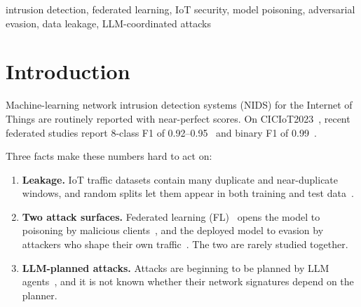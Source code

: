\documentclass[conference]{IEEEtran}
\begin{document}
\begin{abstract}
On GridStratLLM, LLM-planned attacks are detected across planning LLMs (leave-one-LLM-out AUC 0.90--1.00), even without the ARP signature.
A Flower deployment across two Azure virtual machines and a laptop reproduces the simulator to four decimals.
On real traffic without attacks from a laptop on home Wi-Fi, however, the same 1\,\% rule flags 86--89\,\% of windows, mostly HTTP/3 (QUIC). Adding 2.6 minutes of that laptop's benign traffic to training lowers this to 0.45\,\% on held-out traffic from the same session without reducing CICIoT2023 detection.
A YouTube streaming capture recorded three days later supports both results. The locally trained model raises 1.4\,\% false alarms on it. Slowing down, padding or re-TTLing its packets never changes the invariant model's verdict (0 of 20,190 windows), while it changes 3--23\,\% of the plain MLP's verdicts.
\end{abstract}

\begin{IEEEkeywords}
intrusion detection, federated learning, IoT security, model poisoning, adversarial evasion, data leakage, LLM-coordinated attacks
\end{IEEEkeywords}

\section{Introduction}
Machine-learning network intrusion detection systems (NIDS) for the Internet of Things are routinely reported with near-perfect scores. On CICIoT2023~\cite{neto2023ciciot}, recent federated studies report 8-class F1 of 0.92--0.95~\cite{bilal2026dataset} and binary F1 of 0.99~\cite{nayak2026byzantine}.

Three facts make these numbers hard to act on:
\begin{enumerate}
\item \textbf{Leakage.} IoT traffic datasets contain many duplicate and near-duplicate windows, and random splits let them appear in both training and test data~\cite{arp2022dos}.
\item \textbf{Two attack surfaces.} Federated learning (FL)~\cite{mcmahan2017fedavg} opens the model to poisoning by malicious clients~\cite{bagdasaryan2020backdoor}, and the deployed model to evasion by attackers who shape their own traffic~\cite{apruzzese2022realistic}. The two are rarely studied together.
\item \textbf{LLM-planned attacks.} Attacks are beginning to be planned by LLM agents~\cite{kellerer2026gridstrat}, and it is not known whether their network signatures depend on the planner.
\end{enumerate}
\end{document}
